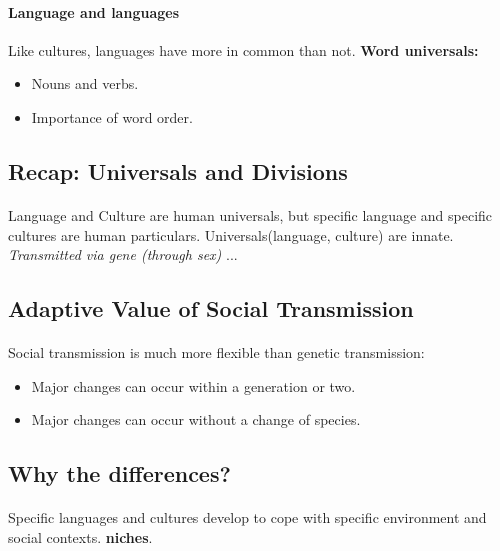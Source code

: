 \documentclass{article}
\begin{document}
	\paragraph{Language and languages} Like cultures, languages have more in common than not.
	\newline \textbf{Word universals:}
	\begin{itemize}
		\item Nouns and verbs.
		\item Importance of word order.
	\end{itemize}

	\subsection{Recap: Universals and Divisions}
	\paragraph{} Language and Culture are human universals, but specific language and specific cultures are human particulars.
	\newline Universals(language, culture) are innate. \emph{Transmitted via gene (through sex)}
	\newline ...

	\subsection{Adaptive Value of Social Transmission}
	\paragraph{} Social transmission is much more flexible than genetic transmission:
	\begin{itemize}
		\item Major changes can occur within a generation or two.
		\item Major changes can occur without a change of species.
	\end{itemize}

	\subsection{Why the differences?}
	\paragraph{} Specific languages and cultures develop to cope with specific environment and social contexts. \textbf{niches}.
\end{document}
